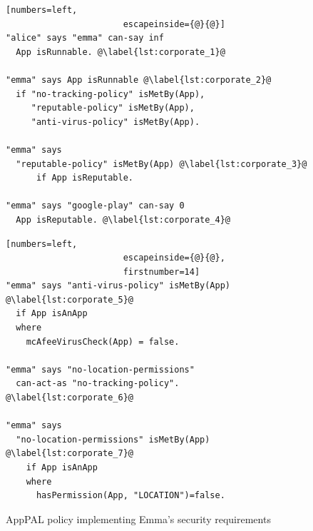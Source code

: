 \documentclass[]{llncs}
\begin{document}
\begin{figure}
  \begin{minipage}[t]{0.5\textwidth}
    \begin{lstlisting}[numbers=left,
                       escapeinside={@}{@}]
"alice" says "emma" can-say inf
  App isRunnable. @\label{lst:corporate_1}@

"emma" says App isRunnable @\label{lst:corporate_2}@
  if "no-tracking-policy" isMetBy(App),
     "reputable-policy" isMetBy(App),
     "anti-virus-policy" isMetBy(App).

"emma" says
  "reputable-policy" isMetBy(App) @\label{lst:corporate_3}@
      if App isReputable.

"emma" says "google-play" can-say 0
  App isReputable. @\label{lst:corporate_4}@
    \end{lstlisting}
  \end{minipage}\begin{minipage}[t]{0.5\textwidth}
    \begin{lstlisting}[numbers=left,
                       escapeinside={@}{@},
                       firstnumber=14]
"emma" says "anti-virus-policy" isMetBy(App) @\label{lst:corporate_5}@
  if App isAnApp
  where
    mcAfeeVirusCheck(App) = false.

"emma" says "no-location-permissions"
  can-act-as "no-tracking-policy". @\label{lst:corporate_6}@

"emma" says
  "no-location-permissions" isMetBy(App) @\label{lst:corporate_7}@
    if App isAnApp
    where
      hasPermission(App, "LOCATION")=false.
\end{lstlisting}
\end{minipage}
\caption{AppPAL policy implementing Emma's security requirements}
\label{lst:corporate}
\end{figure}
\end{document}
